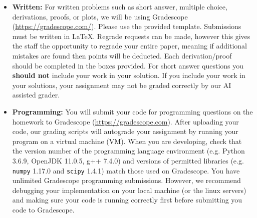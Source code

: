 \documentclass[11pt,addpoints,answers]{exam}
\begin{document}
\begin{itemize}
\begin{itemize}
\begin{comment}
  \item \textbf{Autolab:} You will submit your code for programming
    questions on the homework to Autolab
    (\url{https://autolab.andrew.cmu.edu/}). After uploading your code,
    our grading scripts will autograde your assignment by running your
    program on a virtual machine (VM). 
    When you are developing, check that the
    version number of the programming language environment
    (e.g. Python 2.7.6/3.6.8, Octave 3.8.2, OpenJDK 1.8.0, g++ 4.8.5) and
    versions of permitted libraries (e.g.  \texttt{numpy} 1.11.1 and \texttt{scipy} 0.18.1) 
    match those used on Autolab. DO NOT use any 3rd party
    python packages (i.e. \texttt{sklearn} or \texttt{pandas}) in your implementation! 
    Note: Also do not use \texttt {numpy.loadtxt()}.
    (Octave users: Please make sure you do not use any
    Matlab-specific libraries in your code that might make it fail
    against our tests.)
    You have a {\bf total of 10 Autolab submissions}. Use them
    wisely. In order to not waste Autolab submissions, we recommend
    debugging your implementation on the linux servers to make sure 
    your code is running correctly first
    before any Autolab submission. 
\end{comment}
    
    \item \textbf{Written:} For written problems such as short answer, multiple choice, derivations, proofs, or plots, we will be using Gradescope (\url{https://gradescope.com/}). Please use the provided template. Submissions must be written in LaTeX. Regrade requests can be made, however this gives the staff the opportunity to regrade your entire paper, meaning if additional mistakes are found then points will be deducted.
    Each derivation/proof should be completed in the boxes provided. For short answer questions you \textbf{should not} include your work in your solution.  If you include your work in your solutions, your assignment may not be graded correctly by our AI assisted grader.

    \item \textbf{Programming:} You will submit your code for programming questions on the homework to Gradescope (\url{https://gradescope.com}). After uploading your code, our grading scripts will autograde your assignment by running your program on a virtual machine (VM). When you are developing, check that the version number of the programming language environment (e.g. Python 3.6.9, OpenJDK 11.0.5, g++ 7.4.0) and versions of permitted libraries (e.g.  \texttt{numpy} 1.17.0 and \texttt{scipy} 1.4.1) match those used on Gradescope. You have unlimited Gradescope programming submissions. However, we recommend debugging your implementation on your local machine (or the linux servers) and making sure your code is running correctly first before submitting you code to Gradescope.


\end{itemize}
\end{itemize}
\end{document}
